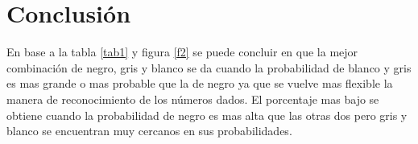 \documentclass[a4paper, 11pt]{article}
\begin{document}
\section{Conclusión}

En base a la tabla \ref{tab1} y figura \ref{f2} se puede concluir en que la mejor combinación de negro, gris y blanco se da cuando la probabilidad de blanco y gris es mas grande o mas probable que la de negro ya que se vuelve mas flexible la manera de reconocimiento de los números dados.
El porcentaje mas bajo se obtiene cuando la probabilidad de negro es mas alta que las otras dos pero gris y blanco se encuentran muy cercanos en sus probabilidades.



\end{document}
